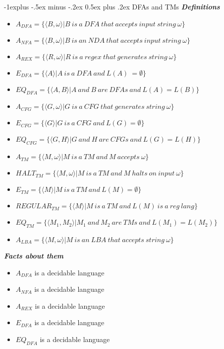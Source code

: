 \documentclass[10pt,landscape]{article}
\makeatletter
\renewcommand{\subsection}{\@startsection{subsection}{2}{0mm}%
                                {-1explus -.5ex minus -.2ex}%
                                {0.5ex plus .2ex}%
                                {\normalfont\normalsize\bfseries}}
\makeatother
\begin{document}
\begin{multicols}{3}
\subsection{DFAs and TMs}
\textbf{\textit{Definitions}}
\begin{itemize}
	\item $A_{DFA} = \{\langle B,\omega\rangle | B\  is\ a\ DFA\ that\ accepts\ input\ string\ \omega\}$
	\item $A_{NFA} = \{\langle B,\omega\rangle | B\ is\ an\ NDA\ that\ accepts\ input\ string\ \omega\}$
	\item $A_{REX} = \{\langle R,\omega\rangle | R\ is\ a\ regex\ that\ generates\ string\ \omega\}$
	\item $E_{DFA} = \{\langle A\rangle | A\ is\ a\ DFA\ and\ L(A)\ = \emptyset\}$
	\item $EQ_{DFA} = \{\langle A,B\rangle | A\ and\ B\ are\ DFAs\ and\ L(A) = L(B)\}$
	\item $A_{CFG} = \{\langle G,\omega\rangle | G\ is\ a\ CFG\ that\ generates\ string\ \omega\}$
	\item $E_{CFG} = \{\langle G\rangle | G\ is\ a\ CFG\ and\ L(G) = \emptyset\}$
	\item $EQ_{CFG} = \{\langle G,H\rangle | G\ and\ H\ are\ CFGs\ and\ L(G) = L(H)\}$
	\item $A_{TM} = \{\langle M,\omega\rangle | M\ is\ a\ TM\ and\ M\ accepts\ \omega\}$
	\item $HALT_{TM} = \{\langle M,\omega\rangle | M\ is\ a\ TM\ and\ M\ halts\ on\ input\ \omega\}$
	\item $E_{TM} = \{\langle M\rangle | M\ is\ a\ TM\ and\ L(M) = \emptyset\}$
	\item $REGULAR_{TM} = \{\langle M\rangle | M\ is\ a\ TM\ and\ L(M)\ is\ a\ reg\ lang\}$
	\item $EQ_{TM} = \{\langle M_{1},M_{2}\rangle | M_{1}\ and\ M_{2}\ are\ TMs\ and\ L(M_{1}) = L(M_{2})\}$
	\item $A_{LBA} = \{\langle M,\omega\rangle | M\ is\ an\ LBA\ that\ accepts\ string\ \omega\}$
\end{itemize}
\textbf{\textit{Facts about them}}
\begin{itemize}
	\item $A_{DFA}$ is a decidable language
	\item $A_{NFA}$ is a decidable language
	\item $A_{REX}$ is a decidable language
	\item $E_{DFA}$ is a decidable language
	\item $EQ_{DFA}$ is a decidable language

\end{itemize}
\end{multicols}
\end{document}
